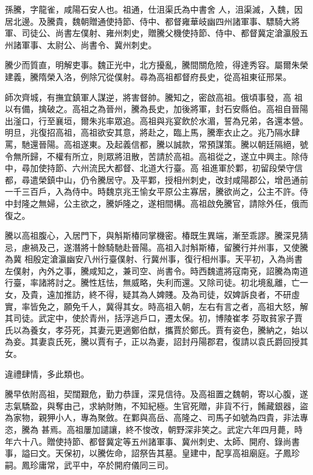 
\begin{pinyinscope}

 孫騰，字龍雀，咸陽石安人也。祖通，仕沮渠氏為中書舍
 人，沮渠滅，入魏，因居北邊。及騰貴，魏朝贈通使持節、侍中、都督雍華岐幽四州諸軍事、驃騎大將軍、司徒公、尚書左僕射、雍州刺史，贈騰父機使持節、侍中、都督冀定滄瀛殷五州諸軍事、太尉公、尚書令、冀州刺史。



 騰少而質直，明解吏事。魏正光中，北方擾亂，騰間關危險，得達秀容。屬爾朱榮建義，騰隋榮入洛，例除冗從僕射。尋為高祖都督府長史，從高祖東征邢杲。



 師次齊城，有撫宜鎮軍人謀逆，將害督帥。騰知之，密啟高祖。俄頃事發，高
 祖以有備，擒破之。高祖之為晉州，騰為長史，加後將軍，封石安縣伯。高祖自晉陽出滏口，行至襄垣，爾朱兆率眾追。高祖與兆宴飲於水湄，誓為兄弟，各還本營。明旦，兆復招高祖，高祖欲安其意，將赴之，臨上馬，騰牽衣止之。兆乃隔水肆罵，馳還晉陽。高祖遂東。及起義信都，騰以誠款，常預謀策。騰以朝廷隔絕，號令無所歸，不權有所立，則眾將沮散，苦請於高祖。高祖從之，遂立中興主。除侍中，尋加使持節、六州流民大都督、北道大行臺。高
 祖進軍於鄴，初留段榮守信都，尋遣榮鎮中山，仍令騰居守。及平鄴，授相州刺史，改封咸陽郡公，增邑通前一千三百戶，入為侍中。時魏京兆王愉女平原公主寡居，騰欲尚之，公主不許。侍中封隆之無婦，公主欲之，騰妒隆之，遂相間構。高祖啟免騰官，請除外任，俄而復之。



 騰以高祖腹心，入居門下，與斛斯椿同掌機密。椿既生異端，漸至乖謬。騰深見猜忌，慮禍及己，遂潛將十餘騎馳赴晉陽。高祖入討斛斯椿，留騰行并州事，又使騰為冀
 相殷定滄瀛幽安八州行臺僕射、行冀州事，復行相州事。天平初，入為尚書左僕射，內外之事，騰咸知之，兼司空、尚書令。時西魏遣將寇南兗，詔騰為南道行臺，率諸將討之。騰性尪怯，無威略，失利而還。又除司徒。初北境亂離，亡一女，及貴，遠加推訪，終不得，疑其為人婢賤。及為司徒，奴婢訴良者，不研虛實，率皆免之，願免千人，冀得其女。時高祖入朝，左右有言之者，高祖大怒，解其司徒。武定中，使於青州，括浮逃戶口，遷太保。初，博陵崔孝
 芬取貧家子賈氏以為養女，孝芬死，其妻元更適鄭伯猷，攜賈於鄭氏。賈有姿色，騰納之，始以為妾。其妻袁氏死，騰以賈有子，正以為妻，詔封丹陽郡君，復請以袁氏爵回授其女。



 違禮肆情，多此類也。



 騰早依附高祖，契闊艱危，勤力恭謹，深見信待。及高祖置之魏朝，寄以心腹，遂志氣驕盈，與奪由己，求納財賄，不知紀極。生官死贈，非貨不行，餚藏銀器，盜為家物，親狎小人，專為聚斂。在鄴與高岳、高隆之、司馬子如號為四貴，非法專恣，騰為
 甚焉。高祖屢加譴讓，終不悛改，朝野深非笑之。武定六年四月薨，時年六十八。贈使持節、都督冀定等五州諸軍事、冀州刺史、太師、開府、錄尚書事，謚曰文。天保初，以騰佐命，詔祭告其墓。皇建中，配享高祖廟庭。子鳳珍嗣。鳳珍庸常，武平中，卒於開府儀同三司。




\end{pinyinscope}
